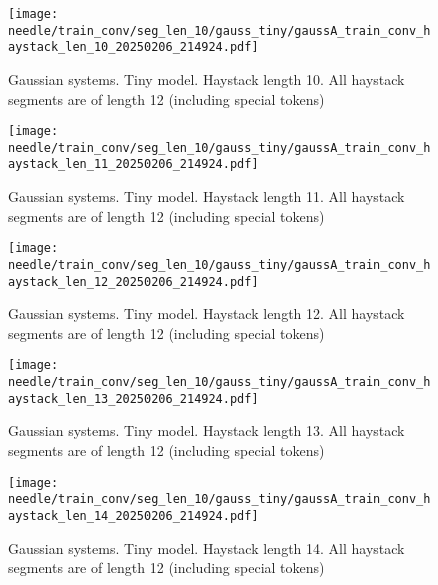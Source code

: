 \begin{figure}[h]
    \centering
    \texttt{[image: needle/train\_conv/seg\_len\_10/gauss\_tiny/gaussA\_train\_conv\_haystack\_len\_10\_20250206\_214924.pdf]}
    \caption{Gaussian systems. Tiny model. Haystack length 10. All haystack segments are of length 12 (including special tokens)}
    \label{fig:gauss_tiny_needle_train_conv_haystack_len_10_all_haystack_len_12}

\end{figure}

\begin{figure}[h]
    \centering
    \texttt{[image: needle/train\_conv/seg\_len\_10/gauss\_tiny/gaussA\_train\_conv\_haystack\_len\_11\_20250206\_214924.pdf]}
    \caption{Gaussian systems. Tiny model. Haystack length 11. All haystack segments are of length 12 (including special tokens)}
    \label{fig:gauss_tiny_needle_train_conv_haystack_len_11_all_haystack_len_12}

\end{figure}

\begin{figure}[h]
    \centering
    \texttt{[image: needle/train\_conv/seg\_len\_10/gauss\_tiny/gaussA\_train\_conv\_haystack\_len\_12\_20250206\_214924.pdf]}
    \caption{Gaussian systems. Tiny model. Haystack length 12. All haystack segments are of length 12 (including special tokens)}
    \label{fig:gauss_tiny_needle_train_conv_haystack_len_12_all_haystack_len_12}

\end{figure}

\begin{figure}[h]
    \centering
    \texttt{[image: needle/train\_conv/seg\_len\_10/gauss\_tiny/gaussA\_train\_conv\_haystack\_len\_13\_20250206\_214924.pdf]}
    \caption{Gaussian systems. Tiny model. Haystack length 13. All haystack segments are of length 12 (including special tokens)}
    \label{fig:gauss_tiny_needle_train_conv_haystack_len_13_all_haystack_len_12}

\end{figure}


\begin{figure}[h]
    \centering
    \texttt{[image: needle/train\_conv/seg\_len\_10/gauss\_tiny/gaussA\_train\_conv\_haystack\_len\_14\_20250206\_214924.pdf]}
    \caption{Gaussian systems. Tiny model. Haystack length 14. All haystack segments are of length 12 (including special tokens)}
    \label{fig:gauss_tiny_needle_train_conv_haystack_len_14_all_haystack_len_12}

\end{figure}


